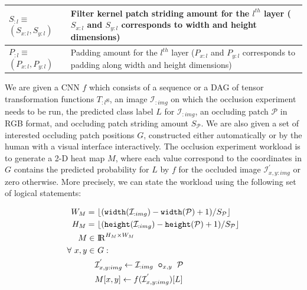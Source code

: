 \begin{table}[t]
{\begin{tabular}{p{2cm}p{7.5cm}}
    \midrule
    $S_{:l}$$\equiv$$(S_{x:l},S_{y:l})$ & Filter kernel patch striding amount for the $l^{th}$ layer ($S_{x:l}$ and $S_{y:l}$ corresponds to width and height dimensions)\\
    \midrule
    $P_{:l}$$\equiv$$(P_{x:l},P_{y:l})$ & Padding amount for the $l^{th}$ layer ($P_{x:l}$ and $P_{y:l}$ corresponds to padding along width and height dimensions)\\
    \bottomrule
  \end{tabular}}
\label{table:preliminaries_symbols}
\end{table}

We are given a CNN $f$ which consists of a sequence or a DAG of tensor transformation functions $T_{:l}$s, an image $\mathcal{I}_{:img}$ on which the occlusion experiment needs to be run, the predicted class label $L$ for $\mathcal{I}_{:img}$, an occluding patch $\mathcal{P}$ in RGB format, and occluding patch striding amount $S_{\mathcal{P}}$.
We are also given a set of interested occluding patch positions $G$, constructed either automatically or by the human with a visual interface interactively.
The occlusion experiment workload is to generate a 2-D heat map $M$, where each value correspond to the coordinates in $G$ contains the predicted probability for $L$ by $f$ for the occluded image $\mathcal{I}^{'}_{x,y:img}$ or zero otherwise.
More precisely, we can state the workload using the following set of logical statements:

\begin{align}
\label{eqn:mheight}
W_M =&~ \lfloor(\texttt{width}(\mathcal{I}_{:img}) - \texttt{width}(\mathcal{P}) + 1)/S_\mathcal{P}\rfloor\\
\label{eqn:mwidth}
H_M =&~ \lfloor(\texttt{height}(\mathcal{I}_{:img}) - \texttt{height}(\mathcal{P}) + 1)/S_\mathcal{P}\rfloor\\
M \in&~ \mathcal{\rm I\!R}^{H_M \times W_M}\\
\forall~ x,y \in&~ G:\\
\label{eqn:patchimpose}
& \mathcal{I}^{'}_{x,y:img} \leftarrow \mathcal{I}_{:img} ~ \bm\circ_{x,y} ~ \mathcal{P} \\
\label{eqn:outputval}
& M[x,y] \leftarrow f(\mathcal{I}^{'}_{x,y:img})[L]
\end{align}


